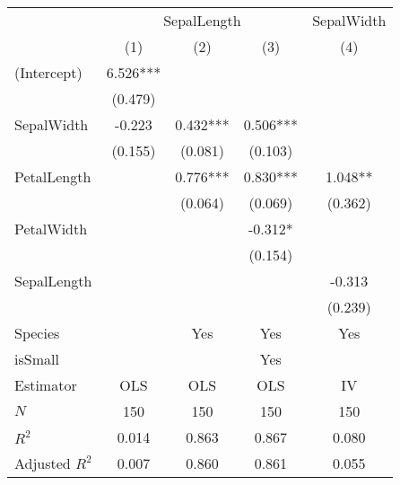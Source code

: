 \begin{tabular}{lcccc}
\toprule
                          & \multicolumn{3}{c}{SepalLength} & \multicolumn{1}{c}{SepalWidth} \\ 
\cmidrule(lr){2-4} \cmidrule(lr){5-5} 
                          &    (1)   &    (2)   &    (3)    &               (4)              \\ 
\midrule
(Intercept)               & 6.526*** &          &           &                                \\ 
                          &  (0.479) &          &           &                                \\ 
SepalWidth                &  -0.223  & 0.432*** &  0.506*** &                                \\ 
                          &  (0.155) &  (0.081) &  (0.103)  &                                \\ 
PetalLength               &          & 0.776*** &  0.830*** &             1.048**            \\ 
                          &          &  (0.064) &  (0.069)  &             (0.362)            \\ 
PetalWidth                &          &          &  -0.312*  &                                \\ 
                          &          &          &  (0.154)  &                                \\ 
SepalLength               &          &          &           &             -0.313             \\ 
                          &          &          &           &             (0.239)            \\ 
\midrule
Species                   &          &    Yes   &    Yes    &               Yes              \\ 
isSmall                   &          &          &    Yes    &                                \\ 
\midrule
Estimator                 &    OLS   &    OLS   &    OLS    &               IV               \\ 
\midrule
$N$                       &    150   &    150   &    150    &               150              \\ 
$R^2$                     &   0.014  &   0.863  &   0.867   &              0.080             \\ 
Adjusted $R^2$            &   0.007  &   0.860  &   0.861   &              0.055             \\ 

\end{tabular}
